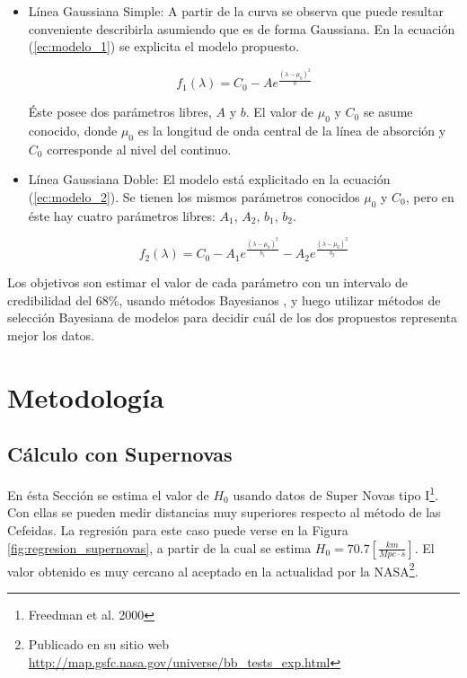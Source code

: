 \documentclass{article}
\begin{document}
\begin{itemize}

\item Línea Gaussiana Simple: A partir de la curva se observa que puede resultar conveniente describirla asumiendo que es de forma Gaussiana. En la ecuación (\ref{ec:modelo_1}) se explicita el modelo propuesto. 

\begin{equation}
f_1(\lambda) = C_0 - A e^{\frac{(\lambda - \mu_0)^2}{b}}
\label{ec:modelo_1}
\end{equation}

Éste posee dos parámetros libres, $A$ y $b$. El valor de $\mu_0$ y $C_0$ se asume conocido, donde $\mu_0$ es la longitud de onda central de la línea de absorción y $C_0$ corresponde al nivel del continuo.  

\item Línea Gaussiana Doble: El modelo está explicitado en la ecuación (\ref{ec:modelo_2}). Se tienen los mismos parámetros conocidos $\mu_0$ y $C_0$, pero en éste hay cuatro parámetros libres: $A_1$, $A_2$, $b_1$, $b_2$.

\begin{equation}
f_2(\lambda) = C_0 - A_1 e^{\frac{(\lambda - \mu_0)^2}{b_1}} - A_2 e^{\frac{(\lambda - \mu_0)^2}{b_2}}
\label{ec:modelo_2}
\end{equation}
\end{itemize}

Los objetivos son estimar el valor de cada parámetro con un intervalo de credibilidad del 68\%, usando métodos Bayesianos , y luego utilizar métodos de selección Bayesiana de modelos para decidir cuál de los dos propuestos representa mejor los datos.

\section{Metodología}



\subsection{Cálculo con Supernovas}
\label{sec:supernovas}

En ésta Sección se estima el valor de $H_0$ usando datos de Super Novas tipo I\footnote{Freedman et al. 2000}. Con ellas se pueden medir distancias muy superiores respecto al método de las Cefeidas. La regresión para este caso puede verse en la Figura \ref{fig:regresion_supernovas}, a partir de la cual se estima $H_0 = 70.7 [\frac{km}{Mpc \cdot s}]$. El valor obtenido es muy cercano al aceptado en la actualidad por la NASA\footnote{Publicado en su sitio web \url{http://map.gsfc.nasa.gov/universe/bb_tests_exp.html}}.
\end{document}
